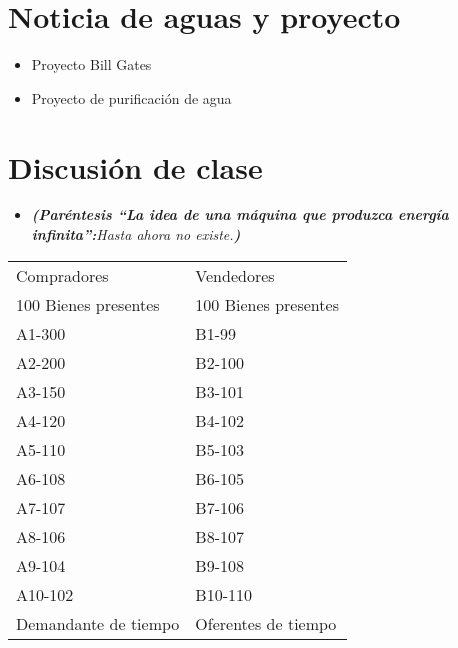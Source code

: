 \section{Noticia de aguas y proyecto}
\begin{itemize}
    \item Proyecto Bill Gates 
    \item Proyecto de purificación de agua 
\end{itemize}


\section{Discusión de clase}
\begin{itemize}
    \item \emph{\textbf{(Paréntesis ``La idea de una máquina que produzca energía infinita'':}Hasta ahora no existe.\textbf{)}}
\end{itemize}

\begin{tabular}{ | p{5cm} | p{5cm} | }
    \hline
     Compradores & Vendedores      \\
     100 Bienes presentes & 100 Bienes presentes \\ 
    \hline
       A1-300 & B1-99 \\ 
       A2-200 & B2-100 \\ 
       A3-150 & B3-101 \\ 
       A4-120 & B4-102 \\ 
       A5-110 & B5-103 \\ 
       A6-108 & B6-105 \\ 
       A7-107 & B7-106 \\ 
       A8-106 & B8-107 \\ 
       A9-104 & B9-108 \\ 
       A10-102 & B10-110 \\ 
   \hline
       Demandante de tiempo & Oferentes de tiempo \\ 
   \hline
\end{tabular}


